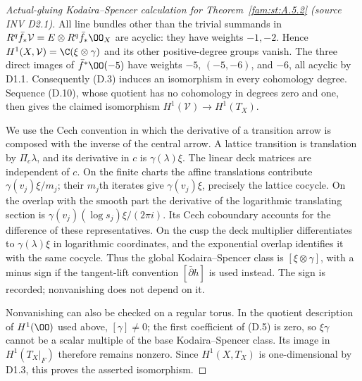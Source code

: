 \begin{proof}[Actual-gluing Kodaira--Spencer calculation for Theorem~\ref{fam:st:A.5.2} (source INV D2.1)]
All line bundles other than the trivial summands in
$R^q\bar f_*\mathcal V=E\otimes R^q\bar f_*\OO_X$ are acyclic:
they have weights $-1,-2$. Hence $H^1(X,\mathcal V)=
\C(\xi\otimes\gamma)$ and its other positive-degree groups vanish.
The three direct images of $\bar f^*\OO(-5)$ have weights
$-5$, $(-5,-6)$, and $-6$, all acyclic by D1.1. Consequently (D.3)
induces an isomorphism in every cohomology degree. Sequence (D.10),
whose quotient has no cohomology in degrees zero and one, then gives
the claimed isomorphism $H^1(\mathcal V)\to H^1(T_X)$.

We use the Cech convention in which the derivative of a transition
arrow is composed with the inverse of the central arrow. A lattice
transition is translation by $\Pi_c\lambda$, and its derivative in
$c$ is $\gamma(\lambda)\xi$. The linear deck matrices are independent
of $c$. On the finite charts the affine translations contribute
$\gamma(v_j)\xi/m_j$; their $m_j$th iterates give
$\gamma(v_j)\xi$, precisely the lattice cocycle. On the overlap with
the smooth part the derivative of the logarithmic translating section
is $\gamma(v_j)(\log s_j)\xi/(2\pi i)$. Its Cech coboundary accounts
for the difference of these representatives. On the cusp the deck
multiplier differentiates to $\gamma(\lambda)\xi$ in logarithmic
coordinates, and the exponential overlap identifies it with the same
cocycle. Thus the global Kodaira--Spencer class is
$[\xi\otimes\gamma]$, with a minus sign if the tangent-lift convention
$[\bar\partial h]$ is used instead. The sign is recorded; nonvanishing
does not depend on it.

Nonvanishing can also be checked on a regular torus. In the quotient
description of $H^1(\OO)$ used above, $[\gamma]\ne0$; the first
coefficient of (D.5) is zero, so $\xi\gamma$ cannot be a scalar
multiple of the base Kodaira--Spencer class. Its image in
$H^1(T_X|_F)$ therefore remains nonzero. Since $H^1(X,T_X)$ is
one-dimensional by D1.3, this proves the asserted isomorphism.
\end{proof}

